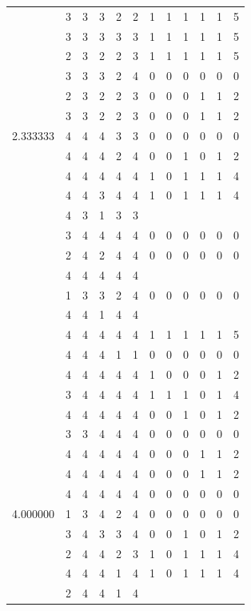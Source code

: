 \documentclass[]{book}
\theoremstyle{definition}
\theoremstyle{definition}
\theoremstyle{definition}
\theoremstyle{remark}
\begin{document}
\begin{table}
{\begin{tabular}[t]{rrrrrrrrrrrr}
 & 3 & 3 & 3 & 2 & 2 & 1 & 1 & 1 & 1 & 1 & 5\\
 & 3 & 3 & 3 & 3 & 3 & 1 & 1 & 1 & 1 & 1 & 5\\
 & 2 & 3 & 2 & 2 & 3 & 1 & 1 & 1 & 1 & 1 & 5\\
 & 3 & 3 & 3 & 2 & 4 & 0 & 0 & 0 & 0 & 0 & 0\\
 & 2 & 3 & 2 & 2 & 3 & 0 & 0 & 0 & 1 & 1 & 2\\
 & 3 & 3 & 2 & 2 & 3 & 0 & 0 & 0 & 1 & 1 & 2\\
2.333333 & 4 & 4 & 4 & 3 & 3 & 0 & 0 & 0 & 0 & 0 & 0\\
 & 4 & 4 & 4 & 2 & 4 & 0 & 0 & 1 & 0 & 1 & 2\\
 & 4 & 4 & 4 & 4 & 4 & 1 & 0 & 1 & 1 & 1 & 4\\
 & 4 & 4 & 3 & 4 & 4 & 1 & 0 & 1 & 1 & 1 & 4\\
 & 4 & 3 & 1 & 3 & 3 &  &  &  &  &  & \\
 & 3 & 4 & 4 & 4 & 4 & 0 & 0 & 0 & 0 & 0 & 0\\
 & 2 & 4 & 2 & 4 & 4 & 0 & 0 & 0 & 0 & 0 & 0\\
 & 4 & 4 & 4 & 4 & 4 &  &  &  &  &  & \\
 & 1 & 3 & 3 & 2 & 4 & 0 & 0 & 0 & 0 & 0 & 0\\
 & 4 & 4 & 1 & 4 & 4 &  &  &  &  &  & \\
 & 4 & 4 & 4 & 4 & 4 & 1 & 1 & 1 & 1 & 1 & 5\\
 & 4 & 4 & 4 & 1 & 1 & 0 & 0 & 0 & 0 & 0 & 0\\
 & 4 & 4 & 4 & 4 & 4 & 1 & 0 & 0 & 0 & 1 & 2\\
 & 3 & 4 & 4 & 4 & 4 & 1 & 1 & 1 & 0 & 1 & 4\\
 & 4 & 4 & 4 & 4 & 4 & 0 & 0 & 1 & 0 & 1 & 2\\
 & 3 & 3 & 4 & 4 & 4 & 0 & 0 & 0 & 0 & 0 & 0\\
 & 4 & 4 & 4 & 4 & 4 & 0 & 0 & 0 & 1 & 1 & 2\\
 & 4 & 4 & 4 & 4 & 4 & 0 & 0 & 0 & 1 & 1 & 2\\
 & 4 & 4 & 4 & 4 & 4 & 0 & 0 & 0 & 0 & 0 & 0\\
4.000000 & 1 & 3 & 4 & 2 & 4 & 0 & 0 & 0 & 0 & 0 & 0\\
 & 3 & 4 & 3 & 3 & 4 & 0 & 0 & 1 & 0 & 1 & 2\\
 & 2 & 4 & 4 & 2 & 3 & 1 & 0 & 1 & 1 & 1 & 4\\
 & 4 & 4 & 4 & 1 & 4 & 1 & 0 & 1 & 1 & 1 & 4\\
 & 2 & 4 & 4 & 1 & 4 &  &  &  &  &  & \\

\end{tabular}}
\end{table}
\end{document}
